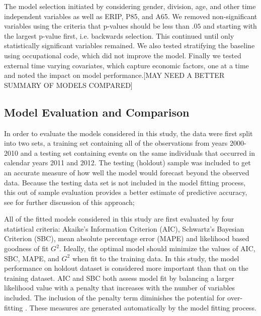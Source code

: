 \documentclass[12pt,letterpaper]{article}
\begin{document}
The model selection initiated by considering gender, division, age, and other time independent variables as well as ERIP, P85, and A65. We removed non-significant variables using the criteria that p-values should be less than $.05$ and starting with the largest p-value first, i.e. backwards selection.  This continued until only statistically significant variables remained.  We also tested stratifying the baseline using occupational code, which did not improve the model. Finally we tested external time varying covariates, which capture economic factors, one at a time and noted the impact on model performance.[MAY NEED A BETTER SUMMARY OF MODELS COMPARED]


\subsection{Model Evaluation and Comparison}

In order to evaluate the models considered in this study, the data were first split into two sets, a training set containing all of the observations from years 2000-2010 and a testing set containing events on the same individuals that occurred in calendar years 2011 and 2012. The testing (holdout) sample was included to get an accurate measure of how well the model would forecast beyond the observed data.  Because the testing data set is not included in the model fitting process, this out of sample evaluation provides a better estimate of predictive accuracy, see \citet{kuhn2013} for further discussion of this approach;

All of the fitted models considered in this study are first evaluated by four statistical criteria:  Akaike’s Information Criterion (AIC), Schwartz’s Bayesian Criterion (SBC), mean absolute percentage error (MAPE) and likelihood based goodness of fit $G^2$. Ideally, the optimal model should minimize the values of AIC, SBC, MAPE, and $G^2$ when fit to the training data. In this study, the model performance on holdout dataset is considered more important than that on the training dataset.
AIC and SBC both assess model fit by balancing a larger likelihood value with a penalty that increases with the number of variables included.  The inclusion of the penalty term diminishes the potential for over-fitting \citep{allison2010,hosmer2013}. These measures are generated automatically by the model fitting process.
\end{document}
